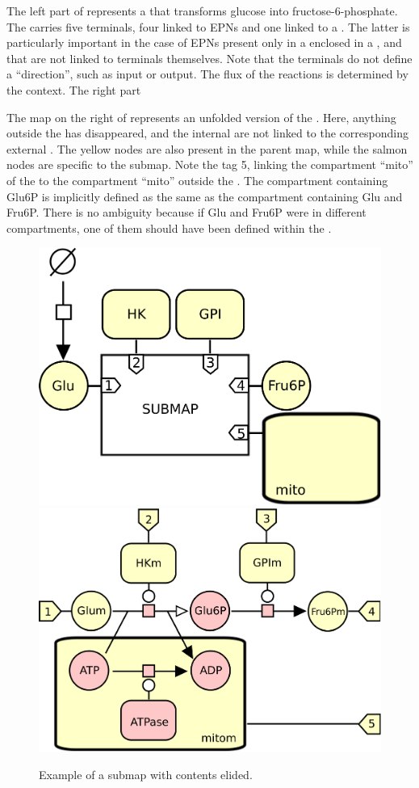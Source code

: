 The left part of  represents a  that transforms glucose into fructose-6-phosphate. The  carries five terminals, four linked to EPNs and one linked to a .  The latter is particularly important in the case of EPNs present only in a  enclosed in a , and that are not linked to terminals themselves.  Note that the terminals do not define a ``direction'', such as input or output.  The flux of the reactions is determined by the context. The right part 

The map on the right of  represents an unfolded version of the .  Here, anything outside the  has disappeared, and the internal  are not linked to the corresponding external . The yellow nodes are also present in the parent map, while the salmon nodes are specific to the submap. Note the tag 5, linking the compartment ``mito'' of the  to the compartment ``mito'' outside the .  The compartment containing Glu6P is implicitly defined as the same as the compartment containing Glu and Fru6P.  There is no ambiguity because if Glu and Fru6P were in different compartments, one of them should have been defined within the .

\begin{figure}[H]
  \centering
  \includegraphics[scale = 0.4]{images/submap-folded}
  \includegraphics[scale = 0.35]{images/submap-unfolded}
  \caption{Example of a submap with contents elided.}
  \label{fig:submap-folded}
\end{figure}






